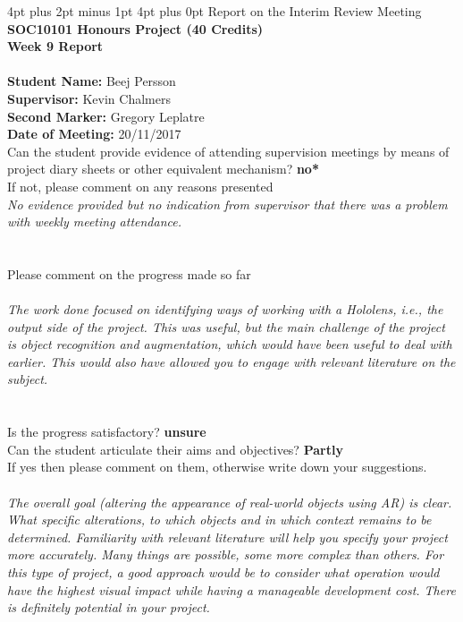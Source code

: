 \documentclass[12pt,a4paper]{article}
\makeatletter
\renewcommand\section{\@startsection {section}{1}{0mm} %
                               {4pt plus 2pt minus 1pt} %
                               {4pt plus 0pt} %
                               {\Large\bfseries}}
\makeatother
\begin{document}
\begin{appendices}
\section{Report on the Interim Review Meeting}
\ \\ \textbf{SOC10101 Honours Project (40 Credits)} \\                   
\textbf{Week 9 Report} \\ \\
\textbf{Student Name:} Beej Persson \\
\textbf{Supervisor:} Kevin Chalmers \\
\textbf{Second Marker:}  Gregory Leplatre \\
\textbf{Date of Meeting:}  20/11/2017 \\
Can the student provide evidence of attending supervision meetings by means of project diary sheets or other equivalent mechanism?  \textbf{no*} \\
\indent If not, please comment on any reasons presented \\
\textsl{No evidence provided but no indication from supervisor that there was a problem with weekly meeting attendance.} \\ \\ \\
Please comment on the progress made so far \\ \\
\textsl{The work done focused on identifying ways of working with a Hololens, i.e., the output side of the project. This was useful, but the main challenge of the project is object recognition and augmentation, which would have been useful to deal with earlier. This would also have allowed you to engage with relevant literature on the subject.} \\ \\ \\
Is the progress satisfactory? \textbf{unsure} \\
Can the student articulate their aims and objectives? \textbf{Partly} \\
If yes then please comment on them, otherwise write down your suggestions. \\ \\
\textsl{The overall goal (altering the appearance of real-world objects using AR) is clear. What specific alterations, to which objects and in which context remains to be determined. Familiarity with relevant literature will help you specify your project more accurately. Many things are possible, some more complex than others. For this type of project, a good approach would be to consider what operation would have the highest visual impact while having a manageable development cost. There is definitely potential in your project.} \\ \\ \\	

\end{appendices}
\end{document}

